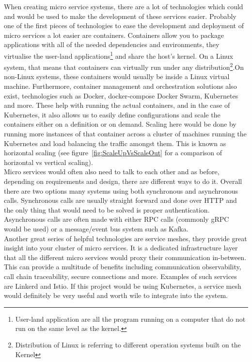 \documentclass{article}
\begin{document}
\begin{multicols}{2}
  When creating micro service systems, there are a lot of technologies which could and would be used to make the development of these services easier. Probably one of the first pieces of technologies to ease the development and deployment of micro services a lot easier are containers. Containers allow you to package applications with all of the needed dependencies and environments, they virtualise the user-land applications\footnote{User-land application are all the program running on a computer that do not run on the same level as the kernel.} and share the host's kernel. On a Linux system, that means that containers can virtually run under any distribution\footnote{Distribution of Linux is referring to different operation systems built on the Kernel}.On non-Linux systems, these containers would usually be inside a Linux virtual machine. Furthermore, container management and orchestration solutions also exist, technologies such as Docker\cite{Docker}, docker-compose\cite{Docker} Docker Swarm\cite{Docker}, Kubernetes\cite{k8s} and more. These help with running the actual containers, and in the case of Kubernetes, it also allows us to easily define configurations and scale the containers either on a definition or on demand. Scaling here would be done by running more instances of that container across a cluster of machines running the Kubernetes and load balancing the traffic amongst them. This is known as horizontal scaling (see figure~\ref{fig:ScaleUpVsScaleOut} for a comparison of horizontal vs vertical scaling).\\
Micro services would often also need to talk to each other and as before, depending on requirements and design, there are different ways to do it. Overall there are two options many systems using both synchronous and asynchronous calls. Synchronous calls are usually straight forward and done over HTTP and the only thing that would need to be solved is proper authentication. Asynchronous calls are often made with either RPC calls (commonly gRPC\cite{grpc} would be used) or a message/event bus system such as Kafka\cite{kafka}.\\
  Another great series of helpful technologies are service meshes, they provide great insight into your cluster of micro services. It is a dedicated infrastructure layer that all the different micro services would proxy their communication in-between. This can provide a multitude of benefits including communication observability, call chain traceability, secure connections and more. Examples of such services are Linkerd\cite{linkerd} and Istio\cite{istio}. If this project would be using Kubernetes, a service mesh would definitely be very useful and worth wile to integrate into the system.\\


\end{multicols}
\end{document}
